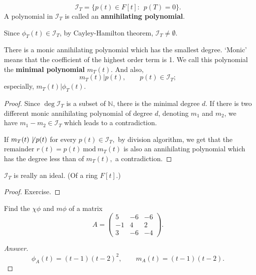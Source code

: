 \begin{defn}
$$\mathcal I_T = \{p(t) \in F[t]:~~p(T) = 0\}.$$
A polynomial in $\mathcal I_T$ is called an \textbf{annihilating polynomial}.
\end{defn}
Since $\phi_T(t) \in \mathcal I_T$, by Cayley-Hamilton theorem, $\mathcal I_T \ne \emptyset.$
\begin{theorem}
There is a monic annihilating polynomial which has the smallest degree. `Monic' means that the coefficient of the highest order term is 1. We call this polynomial the \textbf{minimal polynomial} $m_T(t).$ And also, $$m_T(t) | p(t), \qquad p(t) \in \mathcal I_T;$$especially, $m_T(t) | \phi_T(t).$
\end{theorem}
\begin{proof}
  Since $\operatorname{deg}\mathcal I_T$ is a subset of $\mathbb N$, there is the minimal degree $d$. If there is two different monic annihilating polynomial of degree $d$, denoting $m_1$ and $m_2$, we have $m_1 - m_2 \in \mathcal I_T$ which leads to a contradiction.
  
  If $m_T(t) \not\!|\; p(t)$ for every $p(t)\in\mathcal I_T,$ by division algorithm, we get that the remainder $r(t) = p(t)~\textrm{mod}~m_T(t)$ is also an annihilating polynomial which has the degree less than of $m_T(t),$ a contradiction.
\end{proof}
\begin{prop}
$\mathcal I_T$ is really an ideal. (Of a ring $F[t].$)
\end{prop}
\begin{proof}
  Exercise.
\end{proof}
\begin{ex}
Find the $\chi \phi$ and $m\phi$ of a matrix $$A=\begin{pmatrix}5&-6&-6\\-1&4&2\\3&-6&-4\end{pmatrix}.$$
\end{ex}
\begin{proof}[Answer]
$$\phi_A(t) = (t-1)(t-2)^2 ,\qquad m_A(t) = (t-1)(t-2).$$
\end{proof}
